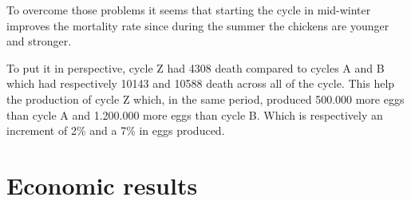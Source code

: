 \documentclass[11pt]{article}
\begin{document}
To overcome those problems it seems that starting the cycle in mid-winter improves the mortality rate since during the summer the chickens are younger and stronger.

To put it in perspective, cycle Z had 4308 death compared to cycles A and B which had respectively 10143 and 10588 death across all of the cycle.
This help the production of cycle Z which, in the same period, produced 500.000 more eggs than cycle A and 1.200.000 more eggs than cycle B. Which is respectively an increment of 2\% and a 7\% in eggs produced.

\section{Economic results}
\end{document}
